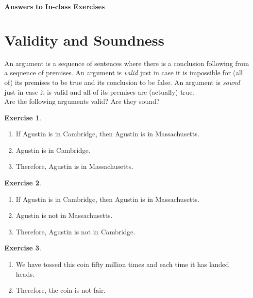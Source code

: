 \documentclass[11pt]{article}
\theoremstyle{definition}
\newtheorem{exer}{Exercise}
\begin{document}




\begin{center}
{\LARGE \bf Answers to In-class Exercises}
\end{center}

\smallskip

\section{Validity and Soundness}

\noindent
An argument is a sequence of sentences where there is a conclusion following from a sequence of premises. An argument is \textit{valid} just in case it is impossible for (all of) its premises to be true and its conclusion to be false. An argument is \textit{sound} just in case it is valid and all of its premises are (actually) true. \\

\noindent
Are the following arguments valid? Are they sound?

\begin{exer}
\hfill
\begin{enumerate}
\item If Agustin is in Cambridge, then Agustin is in Massachusetts. 
\item Agustin is in Cambridge.
\item Therefore, Agustin is in Massachusetts. 
\end{enumerate}
\end{exer}

\begin{exer}
\hfill
\begin{enumerate}
\item If Agustin is in Cambridge, then Agustin is in Massachusetts. 
\item Agustin is not in Massachusetts. 
\item Therefore, Agustin is not in Cambridge. 
\end{enumerate}
\end{exer}

\begin{exer}
\hfill
\begin{enumerate}
\item We have tossed this coin fifty million times and each time it has landed heads. 
\item Therefore, the coin is not fair. 
\end{enumerate}
\end{exer}
\end{document}
